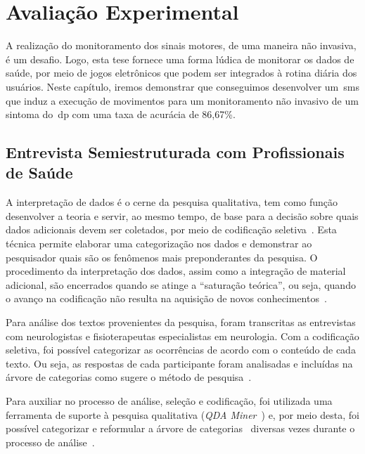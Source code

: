 \chapter{Avalia\c{c}\~{a}o Experimental} \label{chap:avaliacao}
A realização do monitoramento dos sinais motores, de uma maneira não invasiva, é um desafio. Logo, esta tese fornece uma forma lúdica de monitorar os dados de saúde, por meio de jogos eletrônicos que podem ser integrados à rotina diária dos usuários. Neste capítulo, iremos demonstrar que conseguimos desenvolver um~\ac{sms} que induz a execução de movimentos para um monitoramento  não invasivo de um sintoma do~\ac{dp} com uma taxa de acurácia de 86,67\%.




\section{Entrevista Semiestruturada com Profissionais de Saúde}\label{sec:entrevista_semi_estruturada}



A interpretação de dados é o cerne da pesquisa qualitativa, tem como função desenvolver a teoria e servir, ao mesmo tempo, de base para a decisão sobre quais dados adicionais devem ser coletados, por meio de codificação seletiva~\cite{FLI04}. Esta técnica permite elaborar uma categorização nos dados e demonstrar ao pesquisador quais são os fenômenos mais preponderantes da pesquisa. O procedimento da interpretação dos dados, assim como a integração de material adicional, são encerrados quando se atinge a ``saturação teórica'', ou seja, quando o avanço na codificação não resulta na aquisição de novos conhecimentos~\cite{FLI04}.

Para análise dos textos provenientes da pesquisa, foram transcritas as entrevistas com neurologistas e fisioterapeutas especialistas em neurologia. Com  a codificação seletiva, foi possível categorizar as ocorrências de acordo com o conteúdo de cada texto. Ou seja, as respostas de cada participante foram analisadas e incluídas na árvore de categorias como sugere o método de pesquisa~\cite{FLI04}. 

Para auxiliar no processo de análise, seleção e codificação, foi utilizada uma ferramenta de suporte à pesquisa qualitativa (\textit{QDA Miner}~\cite{qda13}) e, por meio desta, foi possível categorizar e reformular a árvore de categorias~\cite{FLI04} diversas vezes durante o processo de análise~\cite{FLI04}.


